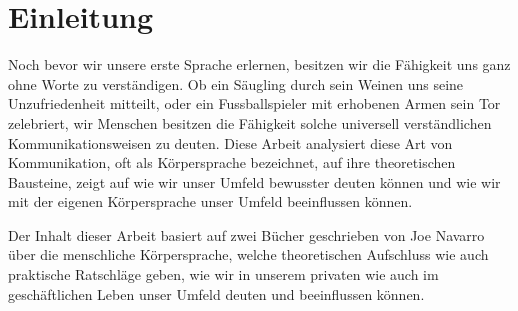 \section{Einleitung}\label{sec:vorwort}
Noch bevor wir unsere erste Sprache erlernen, besitzen wir die Fähigkeit uns ganz ohne Worte zu verständigen.
Ob ein Säugling durch sein Weinen uns seine Unzufriedenheit mitteilt,
oder ein Fussballspieler mit erhobenen Armen sein Tor zelebriert,
wir Menschen besitzen die Fähigkeit solche universell verständlichen Kommunikationsweisen zu deuten.
Diese Arbeit analysiert diese Art von Kommunikation, oft als Körpersprache bezeichnet, auf ihre theoretischen Bausteine,
zeigt auf wie wir unser Umfeld bewusster deuten können und wie wir mit der eigenen Körpersprache unser Umfeld beeinflussen können.
\par
Der Inhalt dieser Arbeit basiert auf zwei Bücher geschrieben von Joe Navarro über die menschliche Körpersprache,
welche theoretischen Aufschluss wie auch praktische Ratschläge geben,
wie wir in unserem privaten wie auch im geschäftlichen Leben unser Umfeld deuten und beeinflussen können.\cite{menschen_verstehen_und_lenken,menschen_lesen}
